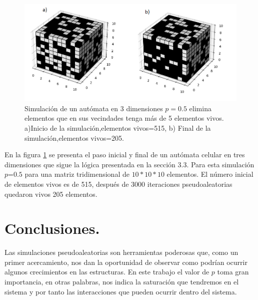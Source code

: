 \documentclass{article}
\begin{document}
\begin{figure}[] 
    \centering
    \includegraphics[width=140mm]{3d.png} 
    \caption{Simulación de un autómata en 3 dimensiones $p=0.5$ elimina elementos que en sus vecindades tenga más de 5 elementos vivos. a)Inicio de la simulación,elementos vivos=515, b) Final de la simulación,elementos vivos=205.}
    \label{3d}
\end{figure}
En la figura \ref{3d} se presenta el paso inicial y final de un autómata celular en tres dimensiones que sigue la lógica presentada en la sección 3.3. Para esta simulación $p$=$0.5$ para una matriz tridimensional de $10*10*10$ elementos. El número inicial de elementos vivos es de 515, después de 3000 iteraciones pseudoaleatorias quedaron vivos 205 elementos. 

\section{Conclusiones.}
 Las simulaciones pseudoaleatorias son herramientas poderosas que, como un primer acercamiento, nos dan la oportunidad de observar como podrían ocurrir algunos crecimientos en las estructuras. En este trabajo el valor de $p$ toma gran importancia, en otras palabras, nos indica la saturación que tendremos en el sistema y por tanto las interacciones que pueden ocurrir dentro del sistema.


\end{document}
